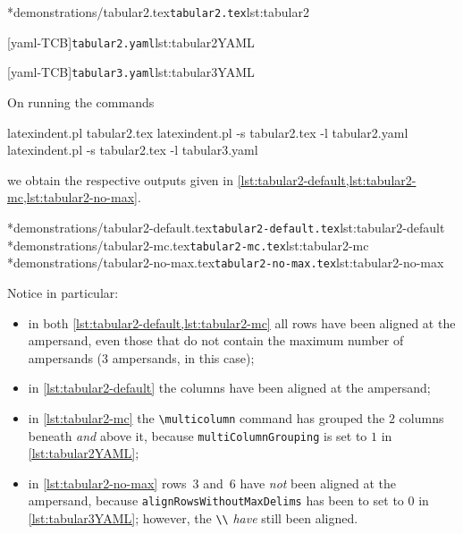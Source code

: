 	\cmhlistingsfromfile[showspaces=false,showtabs=false]*{demonstrations/tabular2.tex}{\texttt{tabular2.tex}}{lst:tabular2}
	\begin{minipage}{.45\textwidth}
		[yaml-TCB]{\texttt{tabular2.yaml}}{lst:tabular2YAML}
	\end{minipage}%
	\hfill
	\begin{minipage}{.45\textwidth}
		[yaml-TCB]{\texttt{tabular3.yaml}}{lst:tabular3YAML}
	\end{minipage}%

	On running the commands
	\begin{commandshell}
latexindent.pl tabular2.tex 
latexindent.pl -s tabular2.tex -l tabular2.yaml
latexindent.pl -s tabular2.tex -l tabular3.yaml
        \end{commandshell}
	we obtain the respective outputs given in \cref{lst:tabular2-default,lst:tabular2-mc,lst:tabular2-no-max}.

	\begin{widepage}
		\cmhlistingsfromfile[showspaces=false,showtabs=false]*{demonstrations/tabular2-default.tex}{\texttt{tabular2-default.tex}}{lst:tabular2-default}
		\cmhlistingsfromfile[showspaces=false,showtabs=false]*{demonstrations/tabular2-mc.tex}{\texttt{tabular2-mc.tex}}{lst:tabular2-mc}
		\cmhlistingsfromfile[showspaces=false,showtabs=false]*{demonstrations/tabular2-no-max.tex}{\texttt{tabular2-no-max.tex}}{lst:tabular2-no-max}
	\end{widepage}

	Notice in particular:
	\begin{itemize}
		\item in both \cref{lst:tabular2-default,lst:tabular2-mc} all rows have been aligned at the ampersand, even
		      those that do not contain the maximum number of ampersands (3 ampersands, in this case);
		\item in \cref{lst:tabular2-default} the columns have been aligned at the ampersand;
		\item in \cref{lst:tabular2-mc} the \lstinline!\multicolumn! command has grouped the $2$ columns beneath \emph{and} above it,
		      because \texttt{multiColumnGrouping} is set to $1$ in \cref{lst:tabular2YAML};
		\item in \cref{lst:tabular2-no-max} rows~3 and~6 have \emph{not} been aligned at the ampersand, because
		      \texttt{alignRowsWithoutMaxDelims} has been to set to $0$ in \cref{lst:tabular3YAML}; however,
		      the \lstinline!\\! \emph{have} still been aligned.
	\end{itemize}

